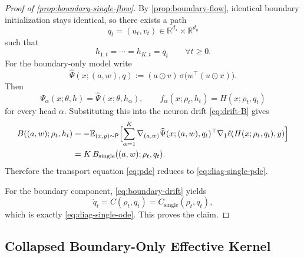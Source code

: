 \documentclass[11pt]{article}
\theoremstyle{definition}
\newcommand{\R}{\mathbb{R}}
\newcommand{\E}{\mathbb{E}}
\begin{document}
\begin{proof}[Proof of \cref{prop:boundary-single-flow}]
By \cref{prop:boundary-flow}, identical boundary initialization stays identical,
so there exists a path
\[
  q_t=(u_t,v_t)\in\R^{d_x}\times\R^{d_y}
\]
such that
\[
  h_{1,t}=\cdots=h_{K,t}=q_t
  \qquad
  \forall t\ge 0.
\]
For the boundary-only model write
\[
  \widehat\Psi(x;(a,w),q)
  :=
  (a\odot v)\,\sigma\!\bigl(w^\top(u\odot x)\bigr).
\]
Then
\[
  \Psi_\alpha(x;\theta,h)=\widehat\Psi(x;\theta,h_\alpha),
  \qquad
  f_\alpha(x;\rho_t,h_t)=H(x;\rho_t,q_t)
\]
for every head $\alpha$. Substituting this into the neuron drift
\eqref{eq:drift-B} gives
\begin{align*}
  B((a,w);\rho_t,h_t)
  &=
  -\E_{(x,y)\sim\mathsf P}
  \Bigl[
    \sum_{\alpha=1}^K
    \nabla_{(a,w)}\widehat\Psi(x;(a,w),q_t)^\top
    \nabla_1\ell(H(x;\rho_t,q_t),y)
  \Bigr]\\
  &=
  K\,B_{\mathrm{single}}((a,w);\rho_t,q_t).
\end{align*}
Therefore the transport equation \eqref{eq:pde} reduces to
\eqref{eq:diag-single-pde}.

For the boundary component, \cref{eq:boundary-drift} yields
\[
  \dot q_t
  =
  C(\rho_t,q_t)
  =
  C_{\mathrm{single}}(\rho_t,q_t),
\]
which is exactly \eqref{eq:diag-single-ode}. This proves the claim.
\end{proof}

\subsection{Collapsed Boundary-Only Effective Kernel}
\end{document}

